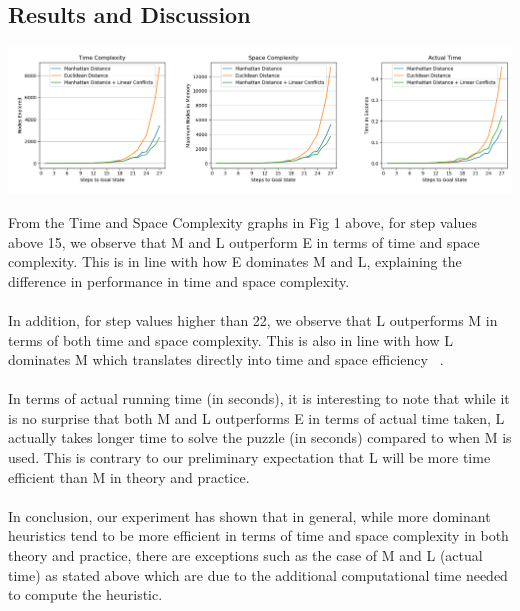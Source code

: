 \documentclass[runningheads]{llncs}
\begin{document}
\subsection{Results and Discussion}
\begin{centering}
    \includegraphics[width=\textwidth]{Figure_1.png}
\end{centering}
From the Time and Space Complexity graphs in Fig 1 above, for step values above 15, we observe that M and L outperform E in terms of time and space complexity. This is in line with how E dominates M and L, explaining the difference in performance in time and space complexity.\\ \\
In addition, for step values higher than 22, we observe that L outperforms M in terms of both time and space complexity. This is also in line with how L dominates M which translates directly into time and space efficiency ~\cite[p104]{stuart_russell_artifical_2010}.\\ \\
In terms of actual running time (in seconds), it is interesting to note that while it is no surprise that both M and L outperforms E in terms of actual time taken, L actually takes longer time to solve the puzzle (in seconds) compared to when M is used.  This is contrary to our preliminary expectation that L will be more time efficient than M in theory and practice. \\ \\
In conclusion, our experiment has shown that in general, while more dominant heuristics tend to be more efficient in terms of time and space complexity in both theory and practice, there are exceptions such as the case of M and L (actual time) as stated above which are due to the additional computational time needed to compute the heuristic.
%
%
%
\pagebreak


\end{document}
